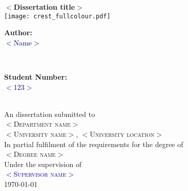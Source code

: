 \thispagestyle{empty}
\begin{titlepage}
		\centering
		\vspace*{1cm}
		\textbf{\LARGE $<$Dissertation title$>$}\\
		\vspace{2cm}	
		\texttt{[image: crest\_fullcolour.pdf]} \\%
		\vspace{1cm}
\begin{minipage}{0.3\textwidth}
	\begin{flushleft} \large
		\textbf{Author:} \\
		\textcolor{darkblue}{$<$Name$>$}
	\end{flushleft}
\end{minipage}~
\begin{minipage}{0.3\textwidth}
	\begin{flushright} \large
		\textbf{Student Number:} \\
		\textcolor{darkblue}{$<$123$>$} 							
	\end{flushright}
\end{minipage}\\
		\vspace{1cm}	
		\large{An dissertation submitted to}\\[0.2cm]        %
		\textsc{$<$Department name$>$} \\[0.2cm]        %
		\textsc{$<$University name$>$, $<$University location$>$} \\
		\vspace{1cm}
		\normalsize{In partial fulfilment of the requirements for the degree of\\
		\textsc{$<$Degree name$>$}}\\
		\vspace{1cm}
		Under the supervision of \\
		\textcolor{darkblue}{\textsc{$<$Supervisor name$>$}}\\
		\vspace{1cm}
		{\normalsize \today} 

\end{titlepage}
